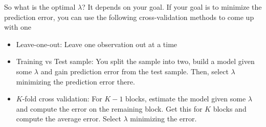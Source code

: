 \begin{mdframed}[backgroundcolor=yellow!5] 

\end{mdframed}
So what is the optimal $\lambda$? It depends on your goal. If your goal is to minimize the prediction error, you can use the following cross-validation methods to come up with one
\begin{itemize}
\item Leave-one-out: Leave one observation out at a time
\item Training vs Test sample: You split the sample into two, build a model given some $\lambda$ and gain prediction error from the test sample. Then, select $\lambda$ minimizing the prediction error there.
\item $K$-fold cross validation:  For $K-1$ blocks, estimate the model given some $\lambda$ and compute the error on the remaining block. Get this for $K$ blocks and compute the average error. Select $\lambda$ minimizing the error. 
\end{itemize}
